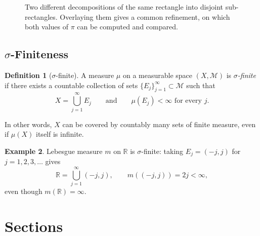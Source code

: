 \documentclass[11pt]{article}
\theoremstyle{definition}
\newtheorem{definition}{Definition}[section]
\newtheorem{example}[definition]{Example}
\theoremstyle{plain}
\newcommand{\R}{\mathbb{R}}
\newcommand{\M}{\mathcal{M}}
\begin{document}
\begin{figure}[H]
\centering
{}
\caption{Two different decompositions of the same rectangle into disjoint
sub-rectangles. Overlaying them gives a common refinement, on which both
values of $\pi$ can be computed and compared.}
\end{figure}

\subsection{\texorpdfstring{$\sigma$}{sigma}-Finiteness}

\begin{definition}[$\sigma$-finite]
A measure $\mu$ on a measurable space $(X,\M)$ is \emph{$\sigma$-finite}
if there exists a countable collection of sets
$\{E_j\}_{j=1}^{\infty} \subset \M$ such that
\[
  X = \bigcup_{j=1}^{\infty} E_j
  \qquad \text{and} \qquad
  \mu(E_j) < \infty \text{ for every } j.
\]
\end{definition}

In other words, $X$ can be covered by countably many sets of finite
measure, even if $\mu(X)$ itself is infinite.

\begin{example}
Lebesgue measure $m$ on $\R$ is $\sigma$-finite: taking
$E_j = (-j,j)$ for $j = 1,2,3,\ldots$ gives
\[
  \R = \bigcup_{j=1}^{\infty} (-j,j),
  \qquad m((-j,j)) = 2j < \infty,
\]
even though $m(\R) = \infty$.
\end{example}

\section{Sections}
\end{document}
